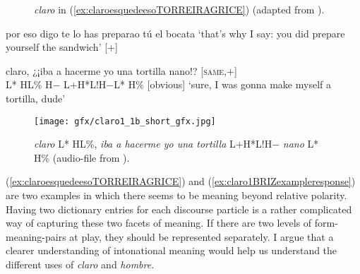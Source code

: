 \begin{figure}
\begin{floatrow}
\captionsetup{margin=.05\linewidth}
%
	{\caption[Low-high-low intonation on \textit{claro}]{\textit{claro} in (\ref{ex:claroesquedeesoTORREIRAGRICE}) (adapted from \cite[15]{TorreiraGrice.2018}).}
	\label{fig:claroTORREIRAGRICE}}%
\end{floatrow}
\end{figure}



\begin{exe}
		\ex \citep[59, line 353]{BrizValEsCo.2002corpus}
\label{ex:claro1BRIZexampleprovocation} 
		\begin{xlist}[A:]
		  por eso digo te lo has preparao tú el bocata
		\glt `that's why I say: you did prepare yourself the sandwich' \hfill [$+$]
		\end{xlist}
		
		\ex \label{ex:claro1BRIZexampleresponse} 		\begin{xlist}[A:]
		  claro, ¿¡iba a hacerme yo una tortilla nano!? \hfill [\textsc{same},$+$] \\
		\hspace*{.1em} L* HL\% \hspace*{4em} H$-$\hspace*{2.5em} L+H*L!H$-$L* H\% \hfill [obvious] 
		\glt `sure, I was gonna make myself a tortilla, dude'
		\end{xlist}
\end{exe}

\begin{sidewaysfigure}	
	\texttt{[image: gfx/claro1\_1b\_short\_gfx.jpg]}
	\caption[\textit{Claro} L* HL\%, \textit{iba a hacerme yo una tortilla nano} L+H* LH\%]{\textit{claro} L* HL\%, \textit{iba a hacerme yo una tortilla} L+H*L!H$-$ \textit{nano} L* H\% (audio-file from \cite{PonsBorderia.2011}). \href{http://www.dpde.es/\#/entry/claro1}{\faExternalLink*}}
	\label{fig:claro1BRIZsentence}		
\end{sidewaysfigure}

(\ref{ex:claroesquedeesoTORREIRAGRICE}) and (\ref{ex:claro1BRIZexampleresponse}) are two examples in which there seems to be meaning beyond relative polarity. Having two dictionary entries for each discourse particle is a rather complicated way of capturing these two facets of meaning. If there are two levels of form-meaning-pairs at play, they should be represented separately. I argue that a clearer understanding of intonational meaning would help us understand the different uses of \textit{claro} and \textit{hombre}. 

